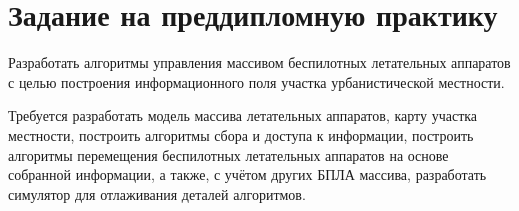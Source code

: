 \newpage
\section{Задание на преддипломную практику}

Разработать алгоритмы управления
массивом беспилотных летательных аппаратов
с целью построения информационного поля
участка урбанистической местности.

Требуется разработать модель массива летательных аппаратов,
карту участка местности, построить алгоритмы сбора и доступа
к информации, построить алгоритмы перемещения беспилотных
летательных аппаратов на основе собранной
информации, а также, с учётом других БПЛА массива,
разработать симулятор для отлаживания деталей алгоритмов.
